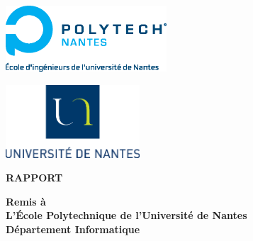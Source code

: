 
\begin{titlepage}	%

\begin{center}



\begin{minipage}[t]{0.48\textwidth}
	\begin{flushleft}
		\includegraphics [width=60mm]{images/logo_ecoles/Polytech_Nantes_Universite} \\
	\end{flushleft}
\end{minipage}
\begin{minipage}[t]{0.48\textwidth}
	\begin{flushright}
		\includegraphics [width=50mm]{images/logo_ecoles/Universite_de_Nantes_} \\
	\end{flushright}
\end{minipage} 

\vfill

\LARGE{\textbf{RAPPORT}} 

\vfill

\Large{\textbf{Remis à}} \\
\LARGE{\textbf{L'École Polytechnique de l'Université de Nantes\\Département Informatique}} 

\vfill 

\end{center}
\end{titlepage}
